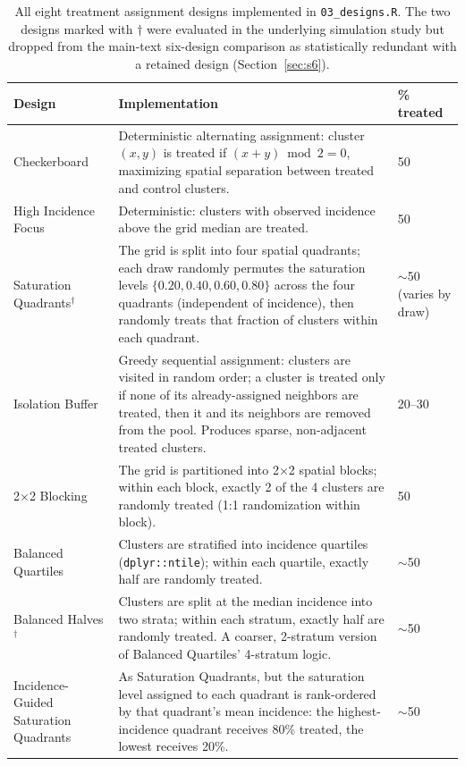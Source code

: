 \documentclass[11pt]{article}
\begin{document}
\begin{table}[h]
\centering
\small
\caption{All eight treatment assignment designs implemented in
\texttt{03\_designs.R}. The two designs marked with $\dagger$ were evaluated in
the underlying simulation study but dropped from the main-text six-design
comparison as statistically redundant with a retained design
(Section~\ref{sec:s6}).}
\begin{tabular}{p{4.0cm}p{9.3cm}p{1.3cm}}
\toprule
Design & Implementation & \% treated \\
\midrule
Checkerboard & Deterministic alternating assignment: cluster $(x,y)$ is treated
  if $(x+y) \bmod 2 = 0$, maximizing spatial separation between treated and
  control clusters. & 50 \\
High Incidence Focus & Deterministic: clusters with observed incidence above
  the grid median are treated. & 50 \\
Saturation Quadrants$^\dagger$ & The grid is split into four spatial quadrants;
  each draw randomly permutes the saturation levels $\{0.20, 0.40, 0.60,
  0.80\}$ across the four quadrants (independent of incidence), then randomly
  treats that fraction of clusters within each quadrant. & $\sim$50 (varies by draw) \\
Isolation Buffer & Greedy sequential assignment: clusters are visited in random
  order; a cluster is treated only if none of its already-assigned neighbors
  are treated, then it and its neighbors are removed from the pool. Produces
  sparse, non-adjacent treated clusters. & 20--30 \\
2$\times$2 Blocking & The grid is partitioned into 2$\times$2 spatial blocks;
  within each block, exactly 2 of the 4 clusters are randomly treated (1:1
  randomization within block). & 50 \\
Balanced Quartiles & Clusters are stratified into incidence quartiles
  (\texttt{dplyr::ntile}); within each quartile, exactly half are randomly
  treated. & $\sim$50 \\
Balanced Halves$^\dagger$ & Clusters are split at the median incidence into two
  strata; within each stratum, exactly half are randomly treated. A coarser,
  2-stratum version of Balanced Quartiles' 4-stratum logic. & $\sim$50 \\
Incidence-Guided Saturation Quadrants & As Saturation Quadrants, but the
  saturation level assigned to each quadrant is rank-ordered by that
  quadrant's mean incidence: the highest-incidence quadrant receives 80\%
  treated, the lowest receives 20\%. & $\sim$50 \\
\bottomrule
\end{tabular}
\end{table}
\end{document}
